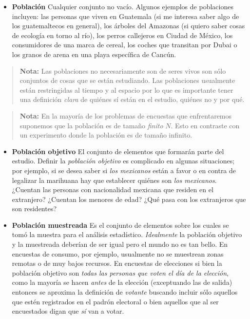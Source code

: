 \documentclass[
]{book}
\providecommand{\tightlist}{%
  \setlength{\itemsep}{0pt}\setlength{\parskip}{0pt}}
\begin{document}
\begin{itemize}
\tightlist
\item
  \textbf{Población} Cualquier conjunto no vacío. Algunos ejemplos de poblaciones incluyen: las personas que viven en Guatemala (si me interesa saber algo de los guatemaltecos en general), los árboles del Amazonas (si quiero saber cosas de ecología en torno al río), los perros callejeros en Ciudad de México, los consumidores de una marca de cereal, los coches que transitan por Dubai o los granos de arena en una playa específica de Cancún.
\end{itemize}

\begin{quote}
\textbf{Nota:} Las poblaciones no necesariamente son de seres vivos son sólo conjuntos de cosas que se están estudiando. Las poblaciones usualmente están restringidas al tiempo y al espacio por lo que es importante tener una definición \emph{clara} de quiénes sí están en el estudio, quiénes no y por qué.
\end{quote}

\begin{quote}
\textbf{Nota:} En la mayoría de los problemas de encuestas que enfrentaremos suponemos que la población es de tamaño \emph{finito} \(N\). Esto en contraste con un experimento donde la población es de tamaño infinito.
\end{quote}

\begin{itemize}
\item
  \textbf{Población objetivo} El conjunto de elementos que formarán parte del estudio. Definir la \emph{población objetivo} es complicado en algunas situaciones; por ejemplo, si se desea saber si \emph{los mexicanos} están a favor o en contra de legalizar la marihuana hay que establecer quiénes son \emph{los mexicanos}. ¿Cuentan las personas con nacionalidad mexicana que residen en el extranjero? ¿Cuentan los menores de edad? ¿Qué pasa con los extranjeros que son residentes?
\item
  \textbf{Población muestreada} Es el conjunto de elementos sobre los cuales se tomó la muestra para el análisis estadístico. \emph{Idealmente} la población objetivo y la muestreada deberían de ser igual pero el mundo no es tan bello. En encuestas de consumo, por ejemplo, usualmente no se muestrean zonas remotas o de muy bajos recursos. En encuestas de elecciones si bien la población objetivo son \emph{todas las personas que voten el día de la elección}, como la mayoría se hacen \emph{antes} de la elección (exceptuando las de salida) entonces se aproxima la definición de \emph{votante} buscando incluir sólo aquellos que estén registrados en el padrón electoral o bien aquellos que al ser encuestados digan que \emph{sí} van a votar.
\end{itemize}
\end{document}
